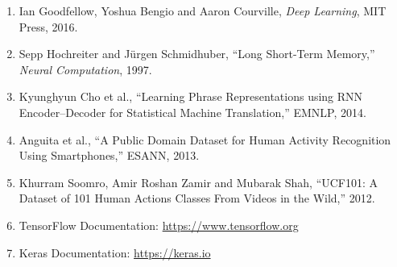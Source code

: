 \documentclass[10pt]{article}
\begin{document}
\begin{enumerate}
\item Ian Goodfellow, Yoshua Bengio and Aaron Courville,
\emph{Deep Learning}, MIT Press, 2016.

\item Sepp Hochreiter and J\"urgen Schmidhuber,
``Long Short-Term Memory,'' \emph{Neural Computation}, 1997.

\item Kyunghyun Cho et al.,
``Learning Phrase Representations using RNN Encoder--Decoder for Statistical
Machine Translation,'' EMNLP, 2014.

\item Anguita et al.,
``A Public Domain Dataset for Human Activity Recognition Using Smartphones,''
ESANN, 2013.

\item Khurram Soomro, Amir Roshan Zamir and Mubarak Shah,
``UCF101: A Dataset of 101 Human Actions Classes From Videos in the Wild,''
2012.

\item TensorFlow Documentation:
\url{https://www.tensorflow.org}

\item Keras Documentation:
\url{https://keras.io}
\end{enumerate}
\end{document}
